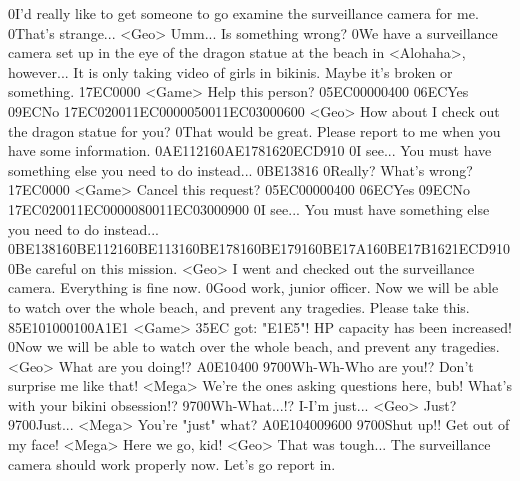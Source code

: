 0I'd really like to get someone to go examine the surveillance camera for me. 
0That's strange... 
<Geo> Umm... 
Is something wrong? 
0We have a surveillance camera set up in the eye of 
the dragon statue at the beach in <Alohaha>, however... 
It is only taking video of girls in bikinis. Maybe it's broken or something. 
{17}{EC}{00}{00} 
<Game> Help this person? {05}{EC}{00}{00}{04}{00}  {06}{EC}Yes   {09}{EC}No 
{17}{EC}{02}{00}{11}{EC}{00}{00}{05}{00}{11}{EC}{03}{00}{06}{00}
<Geo> How about I check out the dragon statue for you? 
0That would be great. Please report to me when you have some information. 
{0A}{E1}{12}{16}{0A}{E1}{78}{16}{20}{EC}{D9}{10}
0I see... You must have something else you need to do instead... 
{0B}{E1}{38}{16}
0Really? What's wrong? 
{17}{EC}{00}{00} 
<Game> Cancel this request? {05}{EC}{00}{00}{04}{00}  {06}{EC}Yes   {09}{EC}No 
{17}{EC}{02}{00}{11}{EC}{00}{00}{08}{00}{11}{EC}{03}{00}{09}{00}
0I see... You must have something else you need to do instead... 
{0B}{E1}{38}{16}{0B}{E1}{12}{16}{0B}{E1}{13}{16}{0B}{E1}{78}{16}{0B}{E1}{79}{16}{0B}{E1}{7A}{16}{0B}{E1}{7B}{16}{21}{EC}{D9}{10}
0Be careful on this mission. 
<Geo> I went and checked out the surveillance camera. Everything is fine now. 
0Good work, junior officer. 
Now we will be able to watch over the whole beach, and prevent any tragedies. 
Please take this. 
{85}{E1}{01}{00}{01}{00}{A1}{E1} 
<Game> {35}{EC} got: "{E1}{E5}"! 
HP capacity has been increased! 
0Now we will be able to watch over the whole beach, and prevent any tragedies. 
<Geo> What are you doing!? 
{A0}{E1}{04}{00} 
{97}{00}Wh-Wh-Who are you!? Don't surprise me like that! 
<Mega> We're the ones asking questions here, bub! What's with your bikini obsession!? 
{97}{00}Wh-What...!? 
I-I'm just... 
<Geo> Just? 
{97}{00}Just... 
<Mega> You're "just" what? 
{A0}{E1}{04}{00}{96}{00} 
{97}{00}Shut up!! Get out of my face! 
<Mega> Here we go, kid! 
<Geo> That was tough... 
The surveillance camera should work properly now. 
Let's go report in. 
